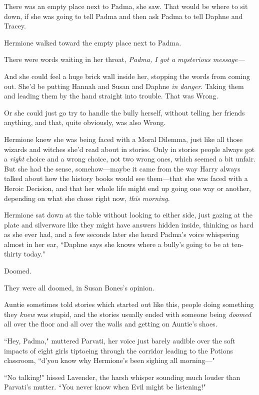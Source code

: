 There was an empty place next to Padma, she saw. That would be where to sit down, if she was going to tell Padma and then ask Padma to tell Daphne and Tracey.

Hermione walked toward the empty place next to Padma.

There were words waiting in her throat, \emph{Padma, I got a \emph{mysterious} message—}

And she could feel a huge brick wall inside her, stopping the words from coming out. She'd be putting Hannah and Susan and Daphne \emph{in danger}. Taking them and leading them by the hand straight into trouble. That was Wrong.

Or she could just go try to handle the bully herself, without telling her friends anything, and that, quite obviously, was also Wrong.

Hermione knew she was being faced with a Moral Dilemma, just like all those wizards and witches she'd read about in stories. Only in stories people always got a \emph{right} choice and a wrong choice, not two wrong ones, which seemed a bit unfair. But she had the sense, somehow—maybe it came from the way Harry always talked about how the history books would see them—that she was faced with a Heroic Decision, and that her whole life might end up going one way or another, depending on what she chose right now, \emph{this morning}.

Hermione sat down at the table without looking to either side, just gazing at the plate and silverware like they might have answers hidden inside, thinking as hard as she ever had, and a few seconds later she heard Padma's voice whispering almost in her ear, ``Daphne says she knows where a bully's going to be at ten-thirty today."

\later

Doomed.

They were all doomed, in Susan Bones's opinion.

Auntie sometimes told stories which started out like this, people doing something they \emph{knew} was stupid, and the stories usually ended with someone being \emph{doomed} all over the floor and all over the walls and getting on Auntie's shoes.

``Hey, Padma," muttered Parvati, her voice just barely audible over the soft impacts of eight girls tiptoeing through the corridor leading to the Potions classroom, ``d'you know why Hermione's been sighing all morning—"

``No talking!" hissed Lavender, the harsh whisper sounding much louder than Parvati's mutter. ``You never know when Evil might be listening!"

